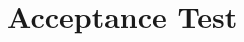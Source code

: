 \documentclass[a4paper,bibtotoc,oneside]{scrbook}
\begin{document}
%



\chapter{Acceptance Test}


%
%


\end{document}
